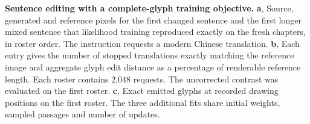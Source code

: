 \textbf{Sentence editing with a complete-glyph training objective.}
\textbf{a}, Source, generated and reference pixels for the first changed sentence and the first longer mixed sentence that likelihood training reproduced exactly on the fresh chapters, in roster order. The instruction requests a modern Chinese translation.
\textbf{b}, Each entry gives the number of stopped translations exactly matching the reference image and aggregate glyph edit distance as a percentage of renderable reference length. Each roster contains 2,048 requests. The uncorrected contrast was evaluated on the first roster.
\textbf{c}, Exact emitted glyphs at recorded drawing positions on the first roster. The three additional fits share initial weights, sampled passages and number of updates.
